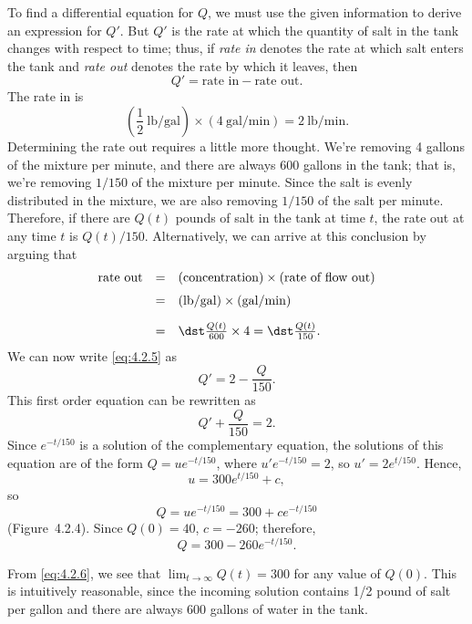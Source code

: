 \begin{examplesolution}
 To find a differential equation for $Q$, we must use the given information to
derive an expression for $Q'$. But $Q'$ is the rate at which the quantity of salt in the tank
changes with respect to time; thus, if {\relax\it rate in\/} denotes the rate at which salt
enters the tank and {\relax\it rate out\/} denotes the rate by which it leaves, then
\begin{equation}
  \label{eq:4.2.5}Q'=\mbox{rate in}-\mbox{rate out}.
\end{equation}
The rate in is
\[
  \left(\frac{1}{2}\ \mbox{lb/gal}\right)\times(4\ \mbox{gal/min})=2\
\mbox{lb/min}.
\]
Determining the rate out requires a little more thought. We're removing 4 gallons of the mixture per
minute, and there are always 600 gallons in the tank; that is, we're removing $1/150$ of the mixture
per minute. Since the salt is evenly distributed in the mixture, we are also removing $1/150$ of the
salt per minute. Therefore, if there are $Q(t)$ pounds of salt in the tank at time $t$, the rate out
at any time $t$ is $Q(t)/150$. Alternatively, we can arrive at this conclusion by arguing that
\[
  \begin{array}{lcl}
    \mbox{rate out} & = & (\mbox{concentration})\times(\mbox{rate of flow out}) \\[6pt]
    \mbox{}         & = & (\mbox{lb/gal})\times(\mbox{gal/min})                 \\[10pt]
                    & = & \dst\frac{Q(t)}{600}\times 4=\dst\frac{Q(t)}{150}.
  \end{array}
\]
We can now write \eqref{eq:4.2.5} as
\[
  Q'=2-\frac{Q}{150}.
\]
This first order equation can be rewritten as
\[
  Q'+\frac{Q}{150}=2.
\]
Since $e^{-t/150}$ is a solution of the complementary equation, the solutions of this equation are
of the form $Q=ue^{-t/150}$, where $u'e^{-t/150}=2$, so $u'=2e^{t/150}$. Hence,
\[
  u=300e^{t/150}+c,
\]
so
\begin{equation}
  \label{eq:4.2.6}Q=ue^{-t/150}=300+ce^{-t/150}
\end{equation}
(Figure~4.2.4). Since $Q(0)=40$, $c=-260$; therefore,
\[
  Q=300-260e^{-t/150}.
\]

 From \eqref{eq:4.2.6}, we see that $\lim_{t\to \infty}Q(t)=300$ for any value
of $Q(0)$. This is intuitively reasonable, since the incoming solution contains 1/2 pound of salt
per gallon and there are always 600 gallons of water in the tank. \quad
\end{examplesolution}

